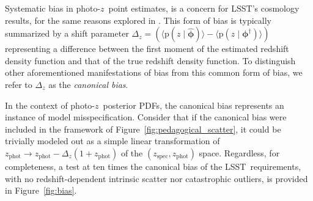 \documentclass[iop]{emulateapj}
\newcommand{\Fig}[1]{Figure~\ref{#1}}
\newcommand{\project}[1]{\textsc{#1}}
\newcommand{\lsst}{\project{LSST}}
\newcommand{\pr}[1]{\ensuremath{\mathrm{p}(#1)}}%
\newcommand{\gvn}{\mid}%
\newcommand{\pz}{photo-$z$}
\newcommand{\pzpdf}{\pz\ posterior PDF}%
\newcommand{\bvec}[1]{\ensuremath{\boldsymbol{#1}}}%
\newcommand{\ndphi}{\bvec{\phi}}
\begin{document}
Systematic bias in \pz\ point estimates, is a concern for \lsst's cosmology results, for the same reasons explored in \citet{hoyle_dark_2018}.
This form of bias is typically summarized by a shift parameter $\Delta_{z} = (\langle \pr{z \gvn \hat{\ndphi}} \rangle - \langle \pr{z \gvn \ndphi^{\dagger}} \rangle)$ representing a difference between the first moment of the estimated redshift density function and that of the true redshift density function.
To distinguish other aforementioned manifestations of bias from this common form of bias, we refer to $\Delta_{z}$ as the \textit{canonical bias}.

In the context of \pzpdf s, the canonical bias represents an instance of model misspecification.
Consider that if the canonical bias were included in the framework of Figure~\ref{fig:pedagogical_scatter}, it could be trivially modeled out as a simple linear transformation of $z_{\mathrm{phot}} \to z_{\mathrm{phot}} - \Delta_{z} (1 + z_{\mathrm{phot}})$ of the $(z_{\mathrm{spec}}, z_{\mathrm{phot}})$ space.
Regardless, for completeness, a test at ten times the canonical bias of the \lsst\ requirements, with no redshift-dependent intrinsic scatter nor catastrophic outliers, is provided in \Fig{fig:bias}.
\end{document}
